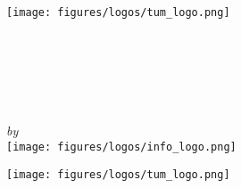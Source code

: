 \begin{titlepage}
    \makeatletter
    \begin{center}
        \texttt{[image: figures/logos/tum\_logo.png]}\\[0.5cm]
        \begin{Huge}
            \MakeUppercase{\getFaculty}
        \end{Huge}\\[0.5cm]
        \begin{large}
            \MakeUppercase{\getUniversity}
        \end{large}\\[2cm]
        \begin{Large}
            \getDoctype%
        \end{Large}\\[2cm]
        \begin{Huge}
            \@title\par
        \end{Huge}
        \vspace{5mm}
        \emph{by}\\
        \getAuthor%
        \vfill
        \texttt{[image: figures/logos/info\_logo.png]}\\
    \end{center}
    \newpage
    \thispagestyle{empty}
    \begin{center}
        \texttt{[image: figures/logos/tum\_logo.png]}\\[0.5cm]
        \begin{Huge}
            \MakeUppercase{\getFaculty}
        \end{Huge}\\[0.5cm]
        \begin{large}
            \MakeUppercase{\getUniversity}
        \end{large}\\[2cm]
        \begin{Large}
            \getDoctype%
        \end{Large}\\[2cm]
        \begin{Huge}

\end{Huge}
\end{center}
\end{titlepage}
